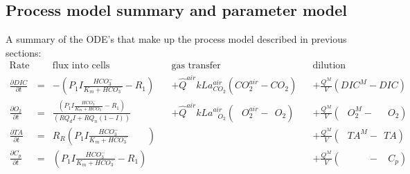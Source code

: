 \documentclass{ruthesis}
\begin{document}
\subsection{Process model summary and parameter model}\label{sec:micro_process_model}

A summary of the ODE's that make up the process model described in previous sections:
\begin{align}
\text{Rate} & & \text{flux into cells}            &            &\text{gas transfer}   &     & \text{dilution} \nonumber                              \\
\frac{\partial DIC}{\partial t}&=&                      - (P_1 I \frac{HCO_3^-}{K_m + HCO_3^-} - R_1)&      &+\hat Q^{air}kLa_{ CO_2}^{air}(CO_{2}^{air} - CO_{2})                  & &+\frac{Q^M}{V}(DIC^{M} - DIC)       \nonumber \\
\frac{\partial O_2}{\partial t}&=& \frac{(P_1 I \frac{HCO_3^-}{K_m + HCO_3^-} - R_1)}{(RQ_d I + RQ_n(1-I))}  &      &+\hat Q^{air}kLa_{\phantom{C}O_2}^{air}(\phantom{C}O_{2}^{air} - \phantom{I}O_{2}) && +\frac{Q^M}{V}(\phantom{C}O_{2}^{M} - \phantom{CC}O_{2})     \nonumber   \\
\frac{\partial TA}{\partial t} & =&      R_R (P_1 I \frac{HCO_3^-}{K_m + HCO_3^-} \phantom{ + R_1})& & & & +\frac{Q^M}{V}(\phantom{C}TA^{M} - \phantom{I}TA) \nonumber\\
\frac{\partial C_p}{\partial t} & =& (P_1 I \frac{HCO_3^-}{K_m + HCO_3^-} - R_1)&  & & & +\frac{Q^M}{V}(\phantom{CTA^{M}} - \phantom{II}C_p) 
\end{align}
\end{document}
